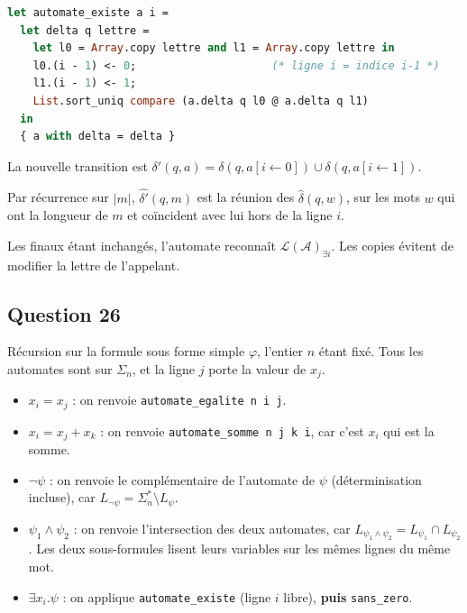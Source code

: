 \documentclass[11pt,a4paper]{article}
\providecommand{\tightlist}{\setlength{\itemsep}{0pt}\setlength{\parskip}{0pt}}
\begin{document}
\begin{lstlisting}[language=Caml]
let automate_existe a i =
  let delta q lettre =
    let l0 = Array.copy lettre and l1 = Array.copy lettre in
    l0.(i - 1) <- 0;                     (* ligne i = indice i-1 *)
    l1.(i - 1) <- 1;
    List.sort_uniq compare (a.delta q l0 @ a.delta q l1)
  in
  { a with delta = delta }
\end{lstlisting}

La nouvelle transition est \(\delta'(q,\allowbreak a)=\delta(q,\allowbreak a[i\leftarrow0])\cup\delta(q,\allowbreak a[i\leftarrow1])\).

Par récurrence sur \(\lvert m\rvert\), \(\widehat{\delta'}(q,m)\) est la réunion des \(\widehat{\delta}(q,w)\), sur les mots \(w\) qui ont la longueur de \(m\) et coïncident avec lui hors de la ligne \(i\).

Les finaux étant inchangés, l'automate reconnaît \(\mathcal{L}(\mathcal{A})_{\exists i}\). Les copies évitent de modifier la lettre de l'appelant.

\hypertarget{question-26}{%
\subsection{Question 26}\label{question-26}}

Récursion sur la formule sous forme simple \(\varphi\), l'entier \(n\) étant fixé. Tous les automates sont sur \(\Sigma_n\), et la ligne \(j\) porte la valeur de \(x_j\).

\begin{itemize}
\tightlist
\item
  \textbf{\(x_i=x_j\)} : on renvoie \texttt{automate\_egalite\ n\ i\ j}.
\item
  \textbf{\(x_i=x_j+x_k\)} : on renvoie \texttt{automate\_somme\ n\ j\ k\ i}, car c'est \(x_i\) qui est la somme.
\item
  \textbf{\(\neg\psi\)} : on renvoie le complémentaire de l'automate de \(\psi\) (déterminisation incluse), car \(L_{\neg\psi}=\Sigma_n^*\setminus L_\psi\).
\item
  \textbf{\(\psi_1\wedge\psi_2\)} : on renvoie l'intersection des deux automates, car \(L_{\psi_1\wedge\psi_2}=L_{\psi_1}\cap L_{\psi_2}\). Les deux sous-formules lisent leurs variables sur les mêmes lignes du même mot.
\item
  \textbf{\(\exists x_i.\psi\)} : on applique \texttt{automate\_existe} (ligne \(i\) libre), \textbf{puis} \texttt{sans\_zero}.
\end{itemize}
\end{document}
